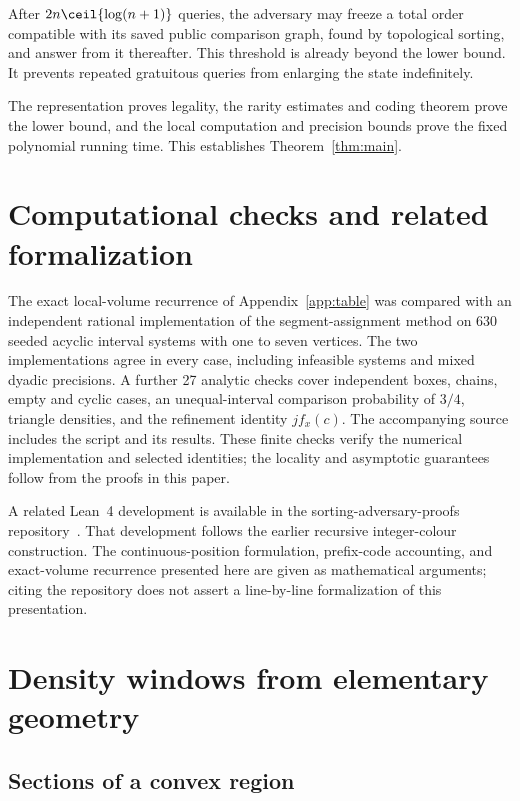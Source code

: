 After \(2n\ceil{\log(n+1)}\) queries, the adversary may freeze a total order compatible with its saved public comparison graph, found by topological sorting, and answer from it thereafter. This threshold is already beyond the lower bound. It prevents repeated gratuitous queries from enlarging the state indefinitely.

The representation proves legality, the rarity estimates and coding theorem prove the lower bound, and the local computation and precision bounds prove the fixed polynomial running time. This establishes Theorem~\ref{thm:main}.

\section{Computational checks and related formalization}\label{sec:revision}

The exact local-volume recurrence of Appendix~\ref{app:table} was compared
with an independent rational implementation of the segment-assignment method
on 630 seeded acyclic interval systems with one to seven vertices. The two
implementations agree in every case, including infeasible systems and mixed
dyadic precisions. A further 27 analytic checks cover independent boxes,
chains, empty and cyclic cases, an unequal-interval comparison probability
of $3/4$, triangle densities, and the refinement identity $j f_x(c)$.
The accompanying source includes the script and its results. These finite
checks verify the numerical implementation and selected identities; the
locality and asymptotic guarantees follow from the proofs in this paper.

A related Lean~4 development is available in the sorting-adversary-proofs
repository~\cite{formalization}. That development follows the earlier
recursive integer-colour construction. The continuous-position formulation,
prefix-code accounting, and exact-volume recurrence presented here are given
as mathematical arguments; citing the repository does not assert a
line-by-line formalization of this presentation.

\appendix
\section{Density windows from elementary geometry}\label{app:geometry}

\subsection{Sections of a convex region}

